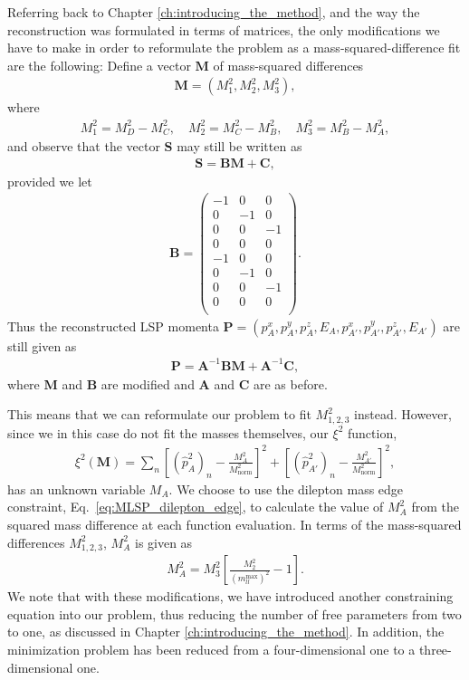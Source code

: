 \documentclass[twoside,english]{uiofysmaster}
\begin{document}
Referring back to Chapter \ref{ch:introducing_the_method}, and the way the reconstruction was formulated in terms of matrices, the only modifications we have to make in order to reformulate the problem as a mass-squared-difference fit are the following: Define a vector $\mathbf{M}$ of mass-squared differences
\begin{align}
	\mathbf{M} = (M^2_1, M^2_2, M^2_3),
\end{align}
where
\begin{align}
	M^2_1 = M_D^2 - M_C^2,\quad  M^2_2 = M_C^2 - M_B^2, \quad M^2_3 = M_B^2 - M_A^2,
\end{align}
and observe that the vector $\mathbf{S}$ may still be written as
\begin{align}
	\mathbf{S} = \mathbf{B}\mathbf{M} + \mathbf{C},
\end{align}
provided we let
\begin{align}
	\mathbf{B} = \begin{pmatrix}
					-1 & 0 & 0 \\
					0 & -1 & 0 \\
					0 & 0 & -1 \\
					0 & 0 & 0 \\
					-1 & 0 & 0  \\
					0 & -1 & 0  \\
					0 & 0 & -1  \\
					0 & 0 & 0 \\
	\end{pmatrix}.
\end{align}
Thus the reconstructed LSP momenta $\mathbf{P} = (p_A^x, p_A^y, p_A^z, E_A, p_{A'}^x, p_{A'}^y, p_{A'}^z, E_{A'})$ are still given as 
\begin{align}
	\mathbf{P} = \mathbf{A}^{-1}\mathbf{B}\mathbf{M} + \mathbf{A}^{-1}\mathbf{C},
\end{align}
where $\mathbf{M}$ and $\mathbf{B}$ are modified and $\mathbf{A}$ and $\mathbf{C}$ are as before.

This means that we can reformulate our problem to fit $M^2_{1,2,3}$ instead. However, since we in this case do not fit the masses themselves, our $\xi^2$ function,
\begin{align}
	\xi^2(\mathbf{M}) = \sum_n \left[(\hat p_{A}^2)_n - \frac{M_A^2}{M_\mathrm{norm}^2}\right]^2 + \left[(\hat p_{A'}^2)_n - \frac{M_{A'}^2}{M_\mathrm{norm}^2}\right]^2,\label{eq:xisquared_modified_repeat}
\end{align} 
has an unknown variable $M_A$. We choose to use the dilepton mass edge constraint, Eq.\ \eqref{eq:MLSP_dilepton_edge}, to calculate the value of $M_A^2$ from the squared mass difference at each function evaluation. In terms of the mass-squared differences $M^2_{1,2,3}$, $M_A^2$ is given as
\begin{align}
	M_A^2 = M^2_3\left[ \frac{M^2_2}{(m_{ll}^\mathrm{max})^ 2} - 1 \right].
\end{align}
We note that with these modifications, we have introduced another constraining equation into our problem, thus reducing the number of free parameters from two to one, as discussed in Chapter \ref{ch:introducing_the_method}. In addition, the minimization problem has been reduced from a four-dimensional one to a three-dimensional one. 
\end{document}
